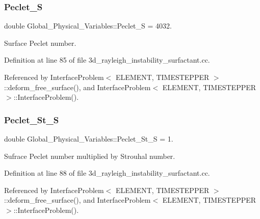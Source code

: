 \subsubsection{\texorpdfstring{Peclet\+\_\+S}{Peclet\_S}}
{\footnotesize\ttfamily double Global\+\_\+\+Physical\+\_\+\+Variables\+::\+Peclet\+\_\+S = 4032.}



Surface Peclet number. 



Definition at line 85 of file 3d\+\_\+rayleigh\+\_\+instability\+\_\+surfactant.\+cc.



Referenced by Interface\+Problem$<$ E\+L\+E\+M\+E\+N\+T, T\+I\+M\+E\+S\+T\+E\+P\+P\+E\+R $>$\+::deform\+\_\+free\+\_\+surface(), and Interface\+Problem$<$ E\+L\+E\+M\+E\+N\+T, T\+I\+M\+E\+S\+T\+E\+P\+P\+E\+R $>$\+::\+Interface\+Problem().

\mbox{\label{namespaceGlobal__Physical__Variables_abec1e1c8c78ade3a7b2e7396321c6466}} 
\subsubsection{\texorpdfstring{Peclet\+\_\+\+St\+\_\+S}{Peclet\_St\_S}}
{\footnotesize\ttfamily double Global\+\_\+\+Physical\+\_\+\+Variables\+::\+Peclet\+\_\+\+St\+\_\+S = 1.}



Sufrace Peclet number multiplied by Strouhal number. 



Definition at line 88 of file 3d\+\_\+rayleigh\+\_\+instability\+\_\+surfactant.\+cc.



Referenced by Interface\+Problem$<$ E\+L\+E\+M\+E\+N\+T, T\+I\+M\+E\+S\+T\+E\+P\+P\+E\+R $>$\+::deform\+\_\+free\+\_\+surface(), and Interface\+Problem$<$ E\+L\+E\+M\+E\+N\+T, T\+I\+M\+E\+S\+T\+E\+P\+P\+E\+R $>$\+::\+Interface\+Problem().

\mbox{\label{namespaceGlobal__Physical__Variables_a0d381c0d7044e78db412ca695e1edca0}} 
